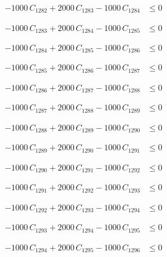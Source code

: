\documentclass[a4paper,11pt]{article}
\begin{document}
\begin{align}
-1000\,C_{1282} + 2000\,C_{1283} - 1000\,C_{1284} &\leq 0 \nonumber
\end{align}

\begin{align}
-1000\,C_{1283} + 2000\,C_{1284} - 1000\,C_{1285} &\leq 0 \nonumber
\end{align}

\begin{align}
-1000\,C_{1284} + 2000\,C_{1285} - 1000\,C_{1286} &\leq 0 \nonumber
\end{align}

\begin{align}
-1000\,C_{1285} + 2000\,C_{1286} - 1000\,C_{1287} &\leq 0 \nonumber
\end{align}

\begin{align}
-1000\,C_{1286} + 2000\,C_{1287} - 1000\,C_{1288} &\leq 0 \nonumber
\end{align}

\begin{align}
-1000\,C_{1287} + 2000\,C_{1288} - 1000\,C_{1289} &\leq 0 \nonumber
\end{align}

\begin{align}
-1000\,C_{1288} + 2000\,C_{1289} - 1000\,C_{1290} &\leq 0 \nonumber
\end{align}

\begin{align}
-1000\,C_{1289} + 2000\,C_{1290} - 1000\,C_{1291} &\leq 0 \nonumber
\end{align}

\begin{align}
-1000\,C_{1290} + 2000\,C_{1291} - 1000\,C_{1292} &\leq 0 \nonumber
\end{align}

\begin{align}
-1000\,C_{1291} + 2000\,C_{1292} - 1000\,C_{1293} &\leq 0 \nonumber
\end{align}

\begin{align}
-1000\,C_{1292} + 2000\,C_{1293} - 1000\,C_{1294} &\leq 0 \nonumber
\end{align}

\begin{align}
-1000\,C_{1293} + 2000\,C_{1294} - 1000\,C_{1295} &\leq 0 \nonumber
\end{align}

\begin{align}
-1000\,C_{1294} + 2000\,C_{1295} - 1000\,C_{1296} &\leq 0 \nonumber
\end{align}
\end{document}
